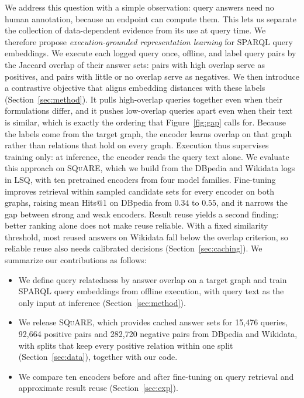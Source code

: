 \documentclass[runningheads]{llncs}
\newcommand{\squareds}{\textsc{SQuARE}}
\begin{document}
We address this question with a simple observation: query answers need no
human annotation, because an endpoint can compute them. This lets us
separate the collection of data-dependent evidence from its use at query
time. We therefore propose \emph{execution-grounded representation learning}
for SPARQL query embeddings. We execute each logged query once, offline, and
label query pairs by the Jaccard overlap of their answer sets: pairs with
high overlap serve as positives, and pairs with little or no overlap serve
as negatives.
We then introduce a contrastive objective that aligns embedding distances
with these labels (Section~\ref{sec:method}). It pulls high-overlap queries
together even when their formulations differ, and it pushes low-overlap
queries apart even when their text is similar, which is exactly the ordering
that Figure~\ref{fig:gap} calls for. Because the labels come from the target
graph, the encoder learns overlap on that graph rather than relations that
hold on every graph. Execution thus supervises training only: at inference,
the encoder reads the query text alone.
We evaluate this approach on \squareds{}, which we build from the DBpedia
and Wikidata logs in LSQ, with ten pretrained encoders from four model
families. Fine-tuning improves retrieval within sampled candidate sets for
every encoder on both graphs, raising mean Hits@1 on DBpedia from $0.34$ to
$0.55$, and it narrows the gap between strong and weak encoders. Result
reuse yields a second finding: better ranking alone does not make reuse
reliable. With a fixed similarity threshold, most reused answers on Wikidata
fall below the overlap criterion, so reliable reuse also needs calibrated
decisions (Section~\ref{sec:caching}). We summarize our contributions as follows:
\begin{itemize}
  \item We define query relatedness by answer
        overlap on a target graph and train SPARQL query embeddings from
        offline execution, with query text as the only input at inference
        (Section~\ref{sec:method}).
  \item We release \squareds{}, which provides cached
        answer sets for 15{,}476 queries, 92{,}664 positive pairs and
        282{,}720 negative pairs from DBpedia and Wikidata, with splits that
        keep every positive relation within one split
        (Section~\ref{sec:data}), together with our code.
  \item We compare ten encoders before and after
        fine-tuning on query retrieval and approximate result reuse
        (Section~\ref{sec:exp}).
\end{itemize}
\end{document}
